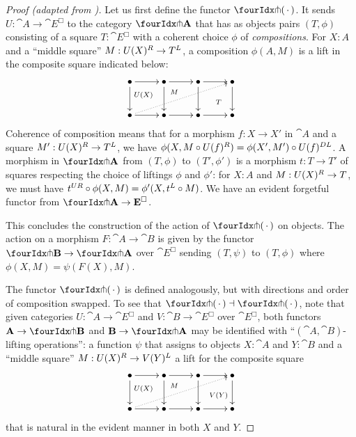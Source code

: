 \documentclass[reqno,10pt,a4paper,oneside]{amsart}
\begin{document}
\begin{proof}[Proof (adapted from \cite{garner:small-object-argument})]
Let us first define the functor $\liftr{\brarghole}$.
It sends $U : \cat{A} \to \cat{E}^{\Box}$ to the category $\liftr{\cat{A}}$ that has as objects pairs $(T, \phi)$ consisting of a square $T : \cat{E}^{\Box}$ with a coherent choice $\phi$ of \emph{compositions}.
For $X : A$ and a ``middle square'' $M : U(X){}^R \to T{}^L$, a composition $\phi(A, M)$ is a lift in the composite square indicated below:
\[
\xymatrix{
  \bullet
  \ar[r]
  \ar[d]
  \ar@{}[dr]|(0.4){U(X)}
&
  \bullet
  \ar[r]
  \ar[d]
  \ar@{}[dr]|(0.3){M}
&
  \bullet
  \ar[r]
  \ar[d]
  \ar@{}[dr]|(0.6){T}
&
  \bullet
  \ar[d]
\\
  \bullet
  \ar[r]
  \ar@{.>}[urrr]
&
  \bullet
  \ar[r]
&
  \bullet
  \ar[r]
&
  \bullet
}
\]
Coherence of composition means that for a morphism $f : X \to X'$ in $\cat{A}$ and a square $M' : U(X){}^R \to T{}^L$, we have $\phi(X, M \mathbin{\circ} U(f){}^R) = \phi(X', M') \mathbin{\circ} U(f){}^{DL}$.
A morphism in $\liftr{\cat{A}}$ from $(T, \phi)$ to $(T', \phi')$ is a morphism $t : T \to T'$ of squares respecting the choice of liftings $\phi$ and $\phi'$: for $X : A$ and $M : U(X){}^R \to T$, we must have $t{}^{UR} \mathbin{\circ} \phi(X, M) = \phi'(X, t{}^L \mathbin{\circ} M)$.
We have an evident forgetful functor from $\liftr{\cat{A}} \to \cat{E}^{\Box}$.

This concludes the construction of the action of $\liftr{\brarghole}$ on objects.
The action on a morphism $F : \cat{A} \to \cat{B}$ is given by the functor $\liftr{\cat{B}} \to \liftr{\cat{A}}$ over $\cat{E}^{\Box}$ sending $(T, \psi)$ to $(T, \phi)$ where $\phi(X, M) = \psi(F(X), M)$.

The functor $\liftl{\brarghole}$ is defined analogously, but with directions and order of composition swapped.
To see that $\liftl{\brarghole} \dashv \liftr{\brarghole}$, note that given categories $U : \cat{A} \to \cat{E}^{\Box}$ and $V : \cat{B} \to \cat{E}^{\Box}$ over $\cat{E}^{\Box}$, both functors $\cat{A} \to \liftl{\cat{B}}$ and $\cat{B} \to \liftr{\cat{A}}$ may be identified with ``$(\cat{A}, \cat{B})$-lifting operations'': a function $\psi$ that assigns to objects $X : \cat{A}$ and $Y : \cat{B}$ and a ``middle square'' $M : U(X){}^R \to V(Y){}^L$ a lift for the composite square 
\[
\xymatrix{
  \bullet
  \ar[r]
  \ar[d]
  \ar@{}[dr]|(0.4){U(X)}
&
  \bullet
  \ar[r]
  \ar[d]
  \ar@{}[dr]|(0.3){M}
&
  \bullet
  \ar[r]
  \ar[d]
  \ar@{}[dr]|(0.6){V(Y)}
&
  \bullet
  \ar[d]
\\
  \bullet
  \ar[r]
  \ar@{.>}[urrr]
&
  \bullet
  \ar[r]
&
  \bullet
  \ar[r]
&
  \bullet
}
\]
that is natural in the evident manner in both $X$ and $Y$.
\end{proof}
\end{document}
